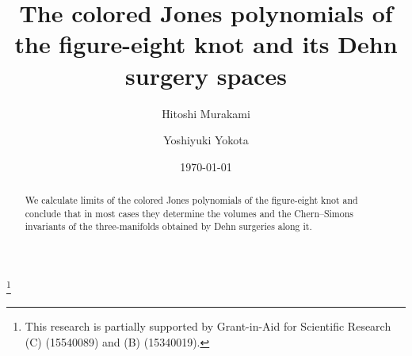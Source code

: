 \documentclass[a4paper]{amsart}
\theoremstyle{plain}
\theoremstyle{definition}
\theoremstyle{remark}
\numberwithin{equation}{section}
\begin{document}
\title[The colored Jones polynomials of the figure-eight knot]
{The colored Jones polynomials of the figure-eight knot
and its Dehn surgery spaces}
\author{Hitoshi Murakami}
\address{
Department of Mathematics,
Tokyo Institute of Technology,
Oh-okayama, Meguro, Tokyo 152-8551, Japan
}
\author{Yoshiyuki Yokota}
\address{
Department of Mathematics,
Tokyo Metropolitan University,
Tokyo 192-0397, Japan}
\date{\today}
\begin{abstract}
We calculate limits of the colored Jones polynomials of the figure-eight knot
and conclude that in most cases they determine the volumes and the Chern--Simons
invariants of the three-manifolds obtained by Dehn surgeries along it.
\end{abstract}
\thanks{This research is partially supported by Grant-in-Aid for Scientific
Research (C) (15540089) and (B) (15340019).}
\maketitle
\end{document}
